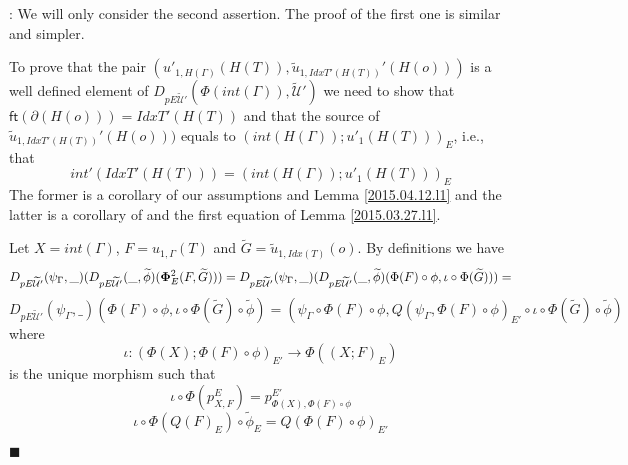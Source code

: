 \documentclass[12pt]{article}
\numberwithin{equation}{section}
\newenvironment{myproof}{{\bf Proof}:}{$\blacksquare$ \vskip 5mm }
\newcommand{\sr}{\rightarrow}
\newcommand{\wt}{\widetilde}
\newcommand{\ft}{\mathsf{ft}}
\newcommand{\U}{\mathcal{U}}
\begin{document}
\begin{myproof}
We will only consider the second assertion. The proof of the first one is
similar and simpler.

To prove that the pair $(u'_{1,H(\Gamma)}(H(T)),
\wt{u}_{1,IdxT'(H(T))}'(H(o)))$ is a well defined element of
$D_{pE\wt{\U}'}(\Phi(int(\Gamma)),\wt{\U}')$ we need to show that
$\ft(\partial(H(o)))=IdxT'(H(T))$ and that the source of
$\wt{u}_{1,IdxT'(H(T))}'(H(o)))$ equals to $(int(H(\Gamma)); u'_1(H(T)))_{E}$,
i.e., that
%
$$int'(IdxT'(H(T)))=(int(H(\Gamma)); u'_1(H(T)))_{E}$$
%
The former is a corollary of our assumptions and Lemma \ref{2015.04.12.l1} and
the latter is a corollary of \cite[Problem 3.3(1)]{fromunivwithPi} and the
first equation of Lemma \ref{2015.03.27.l1}.

Let $X=int(\Gamma)$, $F=u_{1,\Gamma}(T)$ and $\wt{G}=\wt{u}_{1,Idx(T)}(o)$. By
definitions we have
%
$$D_{pE\wt{\U}'}(\psi_{\Gamma},\_)(D_{pE\wt{\U}'}(\_,\wt{\phi})({\bf\Phi}_{E}^2(F,\wt{G})))=D_{pE\wt{\U}'}(\psi_{\Gamma},\_)(D_{pE\wt{\U}'}(\_,\wt{\phi})(\Phi(F)\circ
\phi, \iota\circ \Phi(\wt{G})))=$$
$$D_{pE\wt{\U}'}(\psi_{\Gamma},\_)(\Phi(F)\circ \phi, \iota\circ
\Phi(\wt{G})\circ\wt{\phi})=(\psi_{\Gamma}\circ\Phi(F)\circ \phi,
Q(\psi_{\Gamma},\Phi(F)\circ\phi)_{E'}\circ\iota\circ
\Phi(\wt{G})\circ\wt{\phi})$$
%
where
%
$$\iota:(\Phi(X);\Phi(F)\circ \phi)_{E'}\sr \Phi((X;F)_{E})$$
%
is the unique morphism such that
%
$$\iota\circ \Phi(p^E_{X,F})=p^{E'}_{\Phi(X),\Phi(F)\circ\phi}$$
$$\iota\circ \Phi(Q(F)_E)\circ \wt{\phi}_E=Q(\Phi(F)\circ\phi)_{E'}$$
%


\end{myproof}
\end{document}
